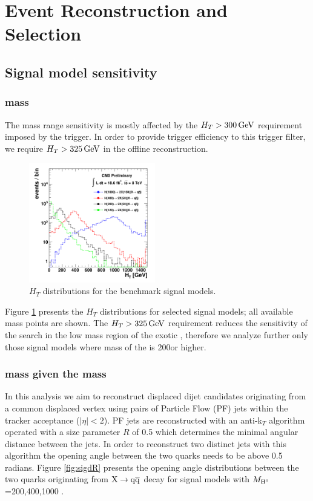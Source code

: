 \section{Event Reconstruction and Selection}

\subsection{Signal model sensitivity}
\label{subsec:sigsensitivity}

\subsubsection{\Higgs mass}

The \Higgs mass range sensitivity is mostly affected by the $H_T>300\,\text{Ge\hspace{-.08em}V}$ requirement imposed by the trigger. 
In order to provide trigger efficiency to this trigger filter,
we require $H_T>325\,\text{Ge\hspace{-.08em}V}$ in the offline reconstruction.

\begin{figure}[htbp]
\centering
\includegraphics[width=0.49\textwidth]{plots/signal/ht.pdf}
\caption{$H_T$ distributions for the benchmark signal models.\label{fig:sight}}
\end{figure}

Figure \ref{fig:sight} presents the $H_T$ distributions for selected signal models; all available \Higgs 
mass points are shown.
The $H_T>325\,\text{Ge\hspace{-.08em}V}$ requirement reduces the sensitivity of the search in the low mass region of the exotic \Higgs,
therefore we analyze further only those signal models where mass of the \Higgs is 200\GeVcc or higher.

\subsubsection{\X mass given the \Higgs mass}

In this analysis we aim to reconstruct displaced dijet candidates originating from a common displaced
vertex using pairs of 
Particle Flow (PF) jets \cite{CMS-PAS-PFT-09-001} within the tracker acceptance ($|\eta|<2$).  
 PF jets are reconstructed with an anti-k$_T$
algorithm operated with a size parameter $R$ of 0.5 \cite{Cacciari:2008gp} which determines
the minimal angular distance between the jets. In order to reconstruct two distinct
jets with this algorithm the opening angle between the two quarks needs to be above 0.5 radians.
Figure \ref{fig:sigdR} presents the opening angle distributions between the two quarks originating
from $\mathrm{X}\rightarrow\mathrm{q}\overline{\mathrm{q}} $ decay for signal models with 
$M_{\mathrm{H}^{0}}$=200,400,1000 \GeVcc.  

